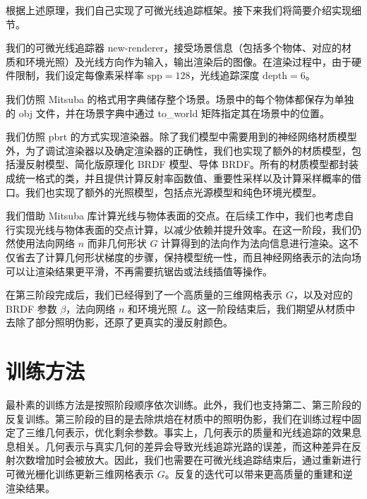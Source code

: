 根据上述原理，我们自己实现了可微光线追踪框架。接下来我们将简要介绍实现细节。

我们的可微光线追踪器 new-renderer，接受场景信息（包括多个物体、对应的材质和环境光照）及光线方向作为输入，输出渲染后的图像。在渲染过程中，由于硬件限制，我们设定每像素采样率 $\text{spp}=128$，光线追踪深度 $\text{depth}=6$。

我们仿照 Mitsuba 的格式用字典储存整个场景。场景中的每个物体都保存为单独的 obj 文件，并在场景字典中通过 to\_world 矩阵指定其在场景中的位置。

我们仿照 pbrt \cite{PBRT3e} 的方式实现渲染器。除了我们模型中需要用到的神经网络材质模型外，为了调试渲染器以及确定渲染器的正确性，我们也实现了额外的材质模型，包括漫反射模型、简化版原理化 BRDF 模型、导体 BRDF。所有的材质模型都封装成统一格式的类，并且提供计算反射率函数值、重要性采样以及计算采样概率的借口。我们也实现了额外的光照模型，包括点光源模型和纯色环境光模型。

我们借助 Mitsuba\cite{Mitsuba3} 库计算光线与物体表面的交点。在后续工作中，我们也考虑自行实现光线与物体表面的交点计算，以减少依赖并提升效率。在这一阶段，我们仍然使用法向网络 $n$ 而非几何形状 $G$ 计算得到的法向作为法向信息进行渲染。这不仅省去了计算几何形状梯度的步骤，保持模型统一性，而且神经网络表示的法向场可以让渲染结果更平滑，不再需要抗锯齿或法线插值等操作。

在第三阶段完成后，我们已经得到了一个高质量的三维网格表示 $G$，以及对应的 BRDF 参数 $\beta$，法向网络 $n$ 和环境光照 $L$。这一阶段结束后，我们期望从材质中去除了部分照明伪影，还原了更真实的漫反射颜色。

\section{训练方法}

最朴素的训练方法是按照阶段顺序依次训练。此外，我们也支持第二、第三阶段的反复训练。第三阶段的目的是去除烘焙在材质中的照明伪影，我们在训练过程中固定了三维几何表示，优化剩余参数。事实上，几何表示的质量和光线追踪的效果息息相关。几何表示与真实几何的差异会导致光线追踪光路的误差，而这种差异在反射次数增加时会被放大。因此，我们也需要在可微光线追踪结束后，通过重新进行可微光栅化训练更新三维网格表示 $G$。反复的迭代可以带来更高质量的重建和逆渲染结果。
